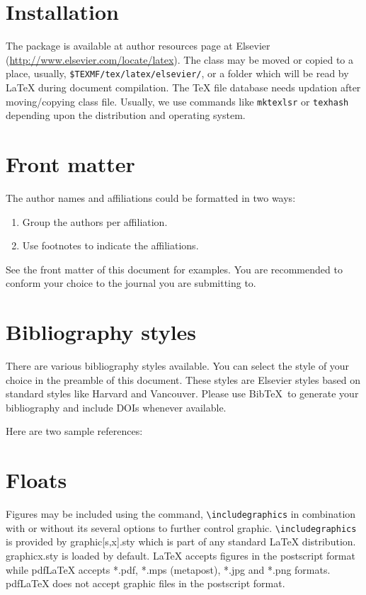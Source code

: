 \documentclass[a4paper,fleqn]{cas-sc}
\begin{document}
\section{Installation}

The package is available at author resources page at Elsevier
(\url{http://www.elsevier.com/locate/latex}).
The class may be moved or copied to a place, usually,\linebreak
\verb+$TEXMF/tex/latex/elsevier/+, %
or a folder which will be read                   
by \LaTeX{} during document compilation.  The \TeX{} file
database needs updation after moving/copying class file.  Usually,
we use commands like \verb+mktexlsr+ or \verb+texhash+ depending
upon the distribution and operating system.

\section{Front matter}

The author names and affiliations could be formatted in two ways:
\begin{enumerate}[(1)]
\item Group the authors per affiliation.
\item Use footnotes to indicate the affiliations.
\end{enumerate}
See the front matter of this document for examples. 
You are recommended to conform your choice to the journal you 
are submitting to.

\section{Bibliography styles}

There are various bibliography styles available. You can select the
style of your choice in the preamble of this document. These styles are
Elsevier styles based on standard styles like Harvard and Vancouver.
Please use Bib\TeX\ to generate your bibliography and include DOIs
whenever available.

Here are two sample references: \citep{Fortunato2010}
\citep{Fortunato2010,NewmanGirvan2004}
\citep{Fortunato2010,Vehlowetal2013}

\section{Floats}
{Figures} may be included using the command,\linebreak 
\verb+\includegraphics+ in
combination with or without its several options to further control
graphic. \verb+\includegraphics+ is provided by {graphic[s,x].sty}
which is part of any standard \LaTeX{} distribution.
{graphicx.sty} is loaded by default. \LaTeX{} accepts figures in
the postscript format while pdf\LaTeX{} accepts {*.pdf},
{*.mps} (metapost), {*.jpg} and {*.png} formats. 
pdf\LaTeX{} does not accept graphic files in the postscript format. 
\end{document}
